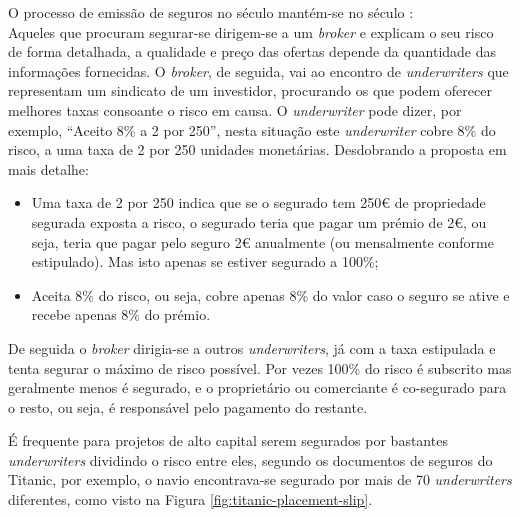             O processo de emissão de seguros no século  mantém-se no século : \\
            Aqueles que procuram segurar-se dirigem-se a um \textit{broker} e explicam o seu risco de forma detalhada, a qualidade e preço das ofertas depende da quantidade das informações fornecidas. O \textit{broker}, de seguida, vai ao encontro de \textit{underwriters} que representam um sindicato de um investidor, procurando os que podem oferecer melhores taxas consoante o risco em causa. O \textit{underwriter} pode dizer, por exemplo, ``Aceito 8\% a 2 por 250'', nesta situação este \textit{underwriter} cobre 8\% do risco, a uma taxa de 2 por 250 unidades monetárias. Desdobrando a proposta em mais detalhe:
            \begin{itemize}
                \item Uma taxa de 2 por 250 indica que se o segurado tem 250€ de propriedade segurada exposta a risco, o segurado teria que pagar um prémio de 2€, ou seja, teria que pagar pelo seguro 2€ anualmente (ou mensalmente conforme estipulado). Mas isto apenas se estiver segurado a 100\%;
                \item Aceita 8\% do risco, ou seja, cobre apenas 8\% do valor caso o seguro se ative e recebe apenas 8\% do prémio.
            \end{itemize}
            De seguida o \textit{broker} dirigia-se a outros \textit{underwriters}, já com a taxa estipulada e tenta segurar o máximo de risco possível. Por vezes 100\% do risco é subscrito mas geralmente menos é segurado, e o proprietário ou comerciante é co-segurado para o resto, ou seja, é responsável pelo pagamento do restante\cite{rate-making,lloyds-and-the-great-fire-of-london-propertycasualty360}.

            É frequente para projetos de alto capital serem segurados por bastantes \textit{underwriters} dividindo o risco entre eles, segundo os documentos de seguros do Titanic, por exemplo, o navio encontrava-se segurado por mais de 70 \textit{underwriters} diferentes\cite{titanic2,titanic}, como visto na Figura \ref{fig:titanic-placement-slip}.

